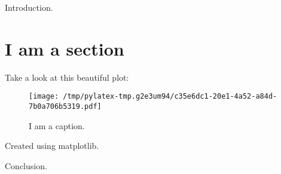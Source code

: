 \documentclass{article}%
\begin{document}
%
\normalsize%
Introduction.%
\section{I am a section}%
\label{sec:Iamasection}%
Take a look at this beautiful plot:%


\begin{figure}[htbp]%
\centering%
\texttt{[image: /tmp/pylatex-tmp.g2e3um94/c35e6dc1-20e1-4a52-a84d-7b0a706b5319.pdf]}%
\caption{I am a caption.}%
\end{figure}

%
Created using matplotlib.

%
Conclusion.%
\end{document}
